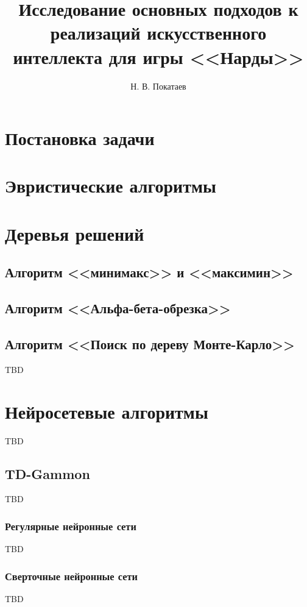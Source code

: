 \documentclass{ammstudconf}
\title{Исследование основных подходов к реализаций искусственного интеллекта для игры <<Нарды>>}
\author{Н. В. Покатаев}
\begin{document}
\maketitle



\section{Постановка задачи}


\section{Эвристические алгоритмы}


\section{Деревья решений}


\subsection{Алгоритм <<минимакс>> и <<максимин>>}


\subsection{Алгоритм <<Альфа-бета-обрезка>>}


\subsection{Алгоритм <<Поиск по дереву Монте-Карло>>}
TBD

\section{Нейросетевые алгоритмы}
TBD

\subsection{TD-Gammon}
TBD

\subsubsection{Регулярные нейронные сети}
TBD

\subsubsection{Сверточные нейронные сети}
TBD
\end{document}
